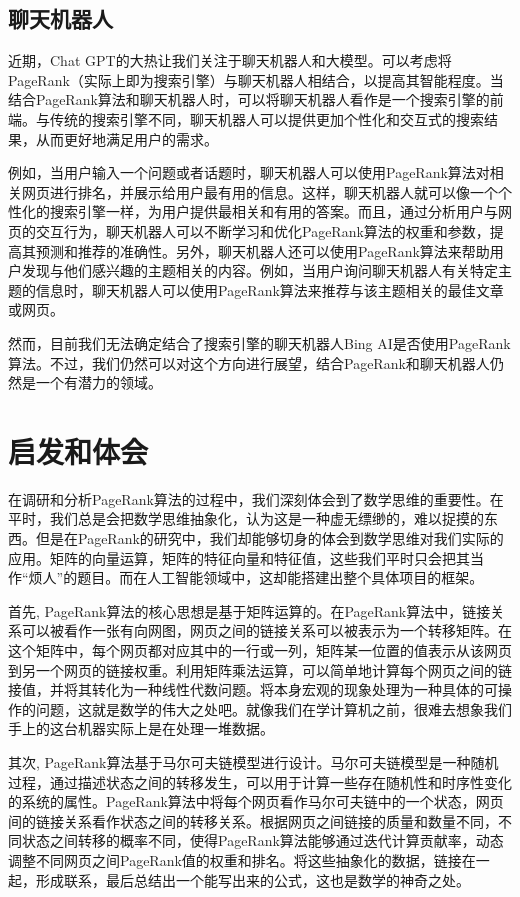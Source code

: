 \documentclass[UTF8,openany]{ctexbook}
\begin{document}
\section[聊天机器人]{聊天机器人}

近期，Chat GPT的大热让我们关注于聊天机器人和大模型。可以考虑将PageRank（实际上即为搜索引擎）与聊天机器人相结合，以提高其智能程度。当结合PageRank算法和聊天机器人时，可以将聊天机器人看作是一个搜索引擎的前端。与传统的搜索引擎不同，聊天机器人可以提供更加个性化和交互式的搜索结果，从而更好地满足用户的需求。

例如，当用户输入一个问题或者话题时，聊天机器人可以使用PageRank算法对相关网页进行排名，并展示给用户最有用的信息。这样，聊天机器人就可以像一个个性化的搜索引擎一样，为用户提供最相关和有用的答案。而且，通过分析用户与网页的交互行为，聊天机器人可以不断学习和优化PageRank算法的权重和参数，提高其预测和推荐的准确性。另外，聊天机器人还可以使用PageRank算法来帮助用户发现与他们感兴趣的主题相关的内容。例如，当用户询问聊天机器人有关特定主题的信息时，聊天机器人可以使用PageRank算法来推荐与该主题相关的最佳文章或网页。

然而，目前我们无法确定结合了搜索引擎的聊天机器人Bing AI是否使用PageRank算法。不过，我们仍然可以对这个方向进行展望，结合PageRank和聊天机器人仍然是一个有潜力的领域。

\chapter[启发和体会]{启发和体会}
\thispagestyle{fancy}

在调研和分析PageRank算法的过程中，我们深刻体会到了数学思维的重要性。在平时，我们总是会把数学思维抽象化，认为这是一种虚无缥缈的，难以捉摸的东西。但是在PageRank的研究中，我们却能够切身的体会到数学思维对我们实际的应用。矩阵的向量运算，矩阵的特征向量和特征值，这些我们平时只会把其当作“烦人”的题目。而在人工智能领域中，这却能搭建出整个具体项目的框架。

首先, PageRank算法的核心思想是基于矩阵运算的。在PageRank算法中，链接关系可以被看作一张有向网图，网页之间的链接关系可以被表示为一个转移矩阵。在这个矩阵中，每个网页都对应其中的一行或一列，矩阵某一位置的值表示从该网页到另一个网页的链接权重。利用矩阵乘法运算，可以简单地计算每个网页之间的链接值，并将其转化为一种线性代数问题。将本身宏观的现象处理为一种具体的可操作的问题，这就是数学的伟大之处吧。就像我们在学计算机之前，很难去想象我们手上的这台机器实际上是在处理一堆数据。

其次, PageRank算法基于马尔可夫链模型进行设计。马尔可夫链模型是一种随机过程，通过描述状态之间的转移发生，可以用于计算一些存在随机性和时序性变化的系统的属性。PageRank算法中将每个网页看作马尔可夫链中的一个状态，网页间的链接关系看作状态之间的转移关系。根据网页之间链接的质量和数量不同，不同状态之间转移的概率不同，使得PageRank算法能够通过迭代计算贡献率，动态调整不同网页之间PageRank值的权重和排名。将这些抽象化的数据，链接在一起，形成联系，最后总结出一个能写出来的公式，这也是数学的神奇之处。
\end{document}
